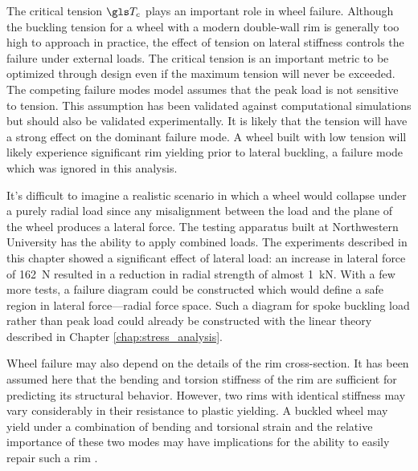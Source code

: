 \documentclass[\rootdir/thesis.tex]{subfiles}
\begin{document}
The critical tension $\T_c$ plays an important role in wheel failure. Although the buckling tension for a wheel with a modern double-wall rim is generally too high to approach in practice, the effect of tension on lateral stiffness controls the failure under external loads. The critical tension is an important metric to be optimized through design even if the maximum tension will never be exceeded. The competing failure modes model assumes that the peak load is not sensitive to tension. This assumption has been validated against computational simulations but should also be validated experimentally. It is likely that the tension will have a strong effect on the dominant failure mode. A wheel built with low tension will likely experience significant rim yielding prior to lateral buckling, a failure mode which was ignored in this analysis.

It's difficult to imagine a realistic scenario in which a wheel would collapse under a purely radial load since any misalignment between the load and the plane of the wheel produces a lateral force. The testing apparatus built at Northwestern University has the ability to apply combined loads. The experiments described in this chapter showed a significant effect of lateral load: an increase in lateral force of \SI{162}{N} resulted in a reduction in radial strength of almost \SI{1}{kN}. With a few more tests, a failure diagram could be constructed which would define a safe region in lateral force---radial force space. Such a diagram for spoke buckling load rather than peak load could already be constructed with the linear theory described in Chapter \ref{chap:stress_analysis}.

Wheel failure may also depend on the details of the rim cross-section. It has been assumed here that the bending and torsion stiffness of the rim are sufficient for predicting its structural behavior. However, two rims with identical stiffness may vary considerably in their resistance to plastic yielding. A buckled wheel may yield under a combination of bending and torsional strain and the relative importance of these two modes may have implications for the ability to easily repair such a rim \cite{Wilson2004}.
\end{document}

